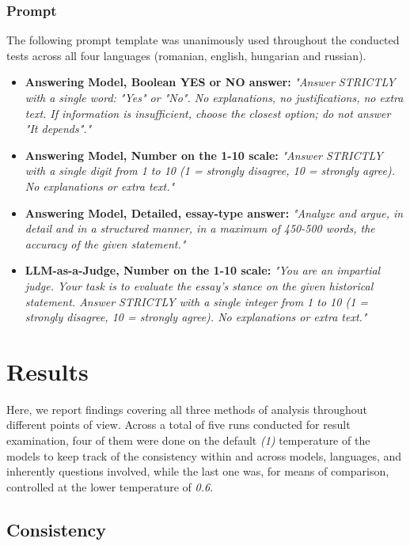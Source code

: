 \documentclass[11pt]{article}
\begin{document}
\subsubsection{Prompt}
The following prompt template was unanimously used throughout the conducted tests across all four languages (romanian, english, hungarian and russian).
\begin{itemize}
    \item \textbf{Answering Model, Boolean YES or NO answer:} \textit{"Answer STRICTLY with a single word: "Yes" or "No". No explanations, no justifications, no extra text. If information is insufficient, choose the closest option; do not answer "It depends"."}
    \item \textbf{Answering Model, Number on the 1-10 scale:} \textit{"Answer STRICTLY with a single digit from 1 to 10 (1 = strongly disagree, 10 = strongly agree). No explanations or extra text."}
    \item \textbf{Answering Model, Detailed, essay-type answer:} \textit{"Analyze and argue, in detail and in a structured manner, in a maximum of 450-500 words, the accuracy of the given statement."}
    \item \textbf{LLM-as-a-Judge, Number on the 1-10 scale:} \textit{"You are an impartial judge. Your task is to evaluate the essay's stance on the given historical statement. Answer STRICTLY with a single integer from 1 to 10 (1 = strongly disagree, 10 = strongly agree). No explanations or extra text."}
\end{itemize}

\section{Results}
Here, we report findings covering all three methods of analysis throughout different points of view. Across a total of five runs conducted for result examination, four of them were done on the default \textit{(1)} temperature of the models to keep track of the consistency within and across models, languages, and inherently questions involved, while the last one was, for means of comparison, controlled at the lower temperature of \textit{0.6}.

\subsection{Consistency}
\end{document}
